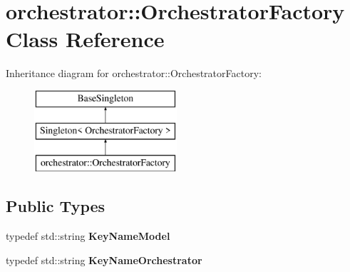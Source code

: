 \hypertarget{classorchestrator_1_1_orchestrator_factory}{}\section{orchestrator\+:\+:Orchestrator\+Factory Class Reference}
\label{classorchestrator_1_1_orchestrator_factory}
Inheritance diagram for orchestrator\+:\+:Orchestrator\+Factory\+:\begin{figure}[H]
\begin{center}
\leavevmode
\includegraphics[height=3.000000cm]{d5/dba/classorchestrator_1_1_orchestrator_factory}
\end{center}
\end{figure}
\subsection*{Public Types}
\begin{DoxyCompactItemize}
\item 
\mbox{\label{classorchestrator_1_1_orchestrator_factory_a0a55e6a91416983dc301f4f3e4756b8c}} 
typedef std\+::string {\bfseries Key\+Name\+Model}
\item 
\mbox{\label{classorchestrator_1_1_orchestrator_factory_a17c141d48d2bc53b52920328effc6060}} 
typedef std\+::string {\bfseries Key\+Name\+Orchestrator}
\end{DoxyCompactItemize}
